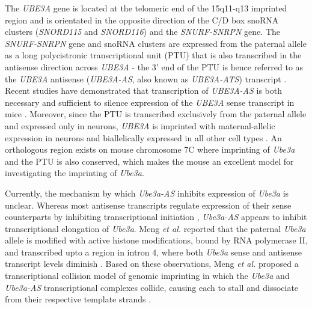 The \textit{UBE3A} gene is located at the telomeric end of the 15q11-q13 imprinted region and is orientated in the opposite direction of the C/D box snoRNA clusters (\textit{SNORD115} and \textit{SNORD116}) and the \textit{SNURF-SNRPN} gene.  The \textit{SNURF-SNRPN} gene and snoRNA clusters are expressed from the paternal allele as a long polycistronic transcriptional unit (PTU) that is also transcribed in the antisense direction across \textit{UBE3A} - the 3' end of the PTU is hence referred to as the \textit{UBE3A} antisense (\textit{UBE3A-AS}, also known as \textit{UBE3A-ATS}) transcript \cite{Runte2001}. Recent studies have demonstrated that transcription of \textit{UBE3A-AS} is both necessary and sufficient to silence expression of the \textit{UBE3A} sense transcript in mice \cite{Meng2013,Martins-Taylor2014}.  Moreover, since the PTU is transcribed exclusively from the paternal allele and expressed only in neurons, \textit{UBE3A} is imprinted with maternal-allelic expression in neurons and biallelically expressed in all other cell types \cite{Runte2001,Yamasaki2003}. An orthologous region exists on mouse chromosome 7C where imprinting of \textit{Ube3a} and the PTU is also conserved, which makes the mouse an excellent model for investigating the imprinting of \textit{Ube3a}.

Currently, the mechanism by which \textit{Ube3a-AS} inhibits expression of \textit{Ube3a} is unclear. Whereas most antisense transcripts regulate expression of their sense counterparts by inhibiting transcriptional initiation \cite{Latos2012,Umlauf2004,Williamson2011}, \textit{Ube3a-AS} appears to inhibit transcriptional elongation of \textit{Ube3a}. Meng \textit{et al.} \cite{Meng2013} reported that the paternal \textit{Ube3a} allele is modified with active histone modifications, bound by RNA polymerase II, and transcribed upto a region in intron 4, where both \textit{Ube3a} sense and antisense transcript levels diminish \cite{Meng2012,Numata2011}.  Based on these observations, Meng \textit{et al.} \cite{Meng2013} proposed a transcriptional collision model of genomic imprinting in which the \textit{Ube3a} and \textit{Ube3a-AS} transcriptional complexes collide, causing each to stall and dissociate from their respective template strands \cite{Meng2013}.

